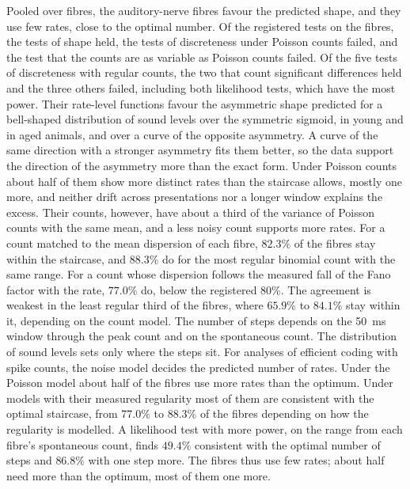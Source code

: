 \documentclass[10pt,letterpaper]{article}
\begin{document}
Pooled over fibres, the auditory-nerve fibres favour the predicted shape, and they use few rates, close to the optimal number. Of the registered
tests on the fibres, the tests of shape held, the tests of discreteness under Poisson counts failed, and the test that the counts are
as variable as Poisson counts failed. Of the five tests of discreteness with regular counts, the two that count significant
differences held and the three others failed, including both likelihood tests, which have the most power. Their rate-level functions favour the asymmetric shape predicted for a bell-shaped distribution of sound levels over the
symmetric sigmoid, in young and in aged animals, and over a curve of the opposite asymmetry. A curve of the same direction with a
stronger asymmetry fits them better, so the data support the direction of the asymmetry more than the exact form. Under Poisson counts about half of them show more distinct rates than the staircase
allows, mostly one more, and neither drift across presentations nor a longer window explains the excess. Their counts, however, have
about a third of the variance of Poisson counts with the same mean, and a less noisy count supports more rates. For a count matched to the mean dispersion
of each fibre, $82.3\%$ of the fibres stay within the staircase, and $88.3\%$ do for the most regular binomial count
with the same range. For a count whose dispersion follows the measured fall of the Fano factor with the rate, $77.0\%$ do, below the
registered $80\%$. The agreement is weakest in the least regular third of the fibres, where $65.9\%$ to $84.1\%$ stay within it,
depending on the count model. The number of steps depends on
the 50~ms window through the peak count and on the spontaneous count. The distribution of sound levels sets only where the steps sit. For analyses of efficient coding with spike counts, the noise model decides the predicted number
of rates. Under the Poisson model about half of the fibres use more rates than the optimum. Under models with their measured
regularity most of them are consistent with the optimal staircase, from $77.0\%$ to $88.3\%$ of the fibres depending on how the
regularity is modelled. A likelihood test with more power, on the range from each fibre's spontaneous count, finds $49.4\%$ consistent with the optimal
number of steps and $86.8\%$ with one step more. The fibres thus use few rates; about half need more than the optimum, most of them one more.
\end{document}
